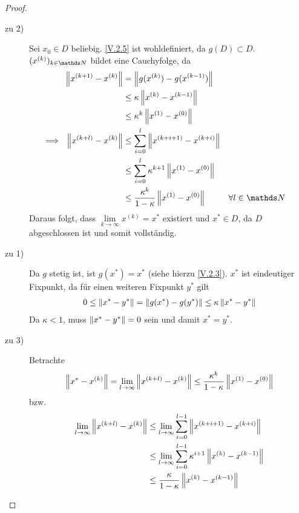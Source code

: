 
\begin{proof}
  \begin{description}
  \item[zu 2)] Sei $x_0\in D$ beliebig. 
    \eqref{V.2.5} ist wohldefiniert, da $g(D)\subset D$.
    $(x^{(k)})_{k\in\N}$ bildet eine Cauchyfolge, da 
    \begin{align*}
      \nn[x^{(k+1)}-x^{(k)}] 
      &= \nn[g(x^{(k)})-g(x^{(k-1)})] \\
      &\leq \kappa \nn[x^{(k)}-x^{(k-1)}] \\
      &\leq \kappa^k\nn[x^{(1)}-x^{(0)}] \\
      \Longrightarrow~~ \nn[x^{(k+l)}-x^{(k)}] 
      &\leq \sum_{i=0}^{l}\nn[x^{(k+i+1)}-x^{(k+i)}] \\
      &\leq \sum_{i=0}^{l}\kappa^{k+1}\nn[x^{(1)}-x^{(0)}]\\
      &\leq \frac{\kappa^k}{1-\kappa}\nn[x^{(1)}-x^{(0)}]
      &&\forall l\in\N 
    \end{align*}
    Daraus folgt, dass 
    $\lim\limits_{k\rightarrow \infty} x^{(k)}=x^{*} $ existiert 
    und $x^{*}\in D$, da $D$ abgeschlossen ist und somit vollständig.

  \item[zu 1)] Da $g$ stetig ist, 
    ist $g(x^{*})=x^{*}$ (siehe hierzu \eqref{V.2.3}). 
    $x^{*}$ ist eindeutiger Fixpunkt, 
    da für einen weiteren Fixpunkt $y^{*}$ gilt
    \begin{gather*}
      0\leq\nn[x^{*}-y^{*}]=\nn[g(x^{*})-g(y^{*})]\leq\kappa\nn[x^{*}-y^{*}]
    \end{gather*}
    Da $\kappa<1$, muss $ \nn[x^{*}-y^{*}]=0$ sein und damit $x^{*}=y^{*}$.
    
  \item[zu 3)] Betrachte 
    \begin{gather*}
      \nn[x^{*}-x^{(k)}] 
      = \lim\limits_{l\rightarrow \infty} \nn[x^{(k+l)}-x^{(k)}]
      \leq  \frac{\kappa^k}{1-\kappa} \nn[x^{(1)}- x^{(0)}]
    \end{gather*}
    bzw.
    \begin{align*}
      \lim\limits_{l\rightarrow \infty} \nn[x^{(k+l)}-x^{(k)}]
      &\leq \lim\limits_{l\rightarrow \infty} \sum_{i=0}^{l-1}\nn[x^{(k+i+1)}-x^{(k+i)}] \\
      &\leq \lim\limits_{l\rightarrow \infty}\sum_{i=0}^{l-1}\kappa^{i+1} \nn[x^{(k)}-x^{(k-1)}] \\
      &\leq \frac{\kappa}{1-\kappa} \nn[x^{(k)}-x^{(k-1)}] 
    \end{align*}
  \end{description}
\end{proof}


